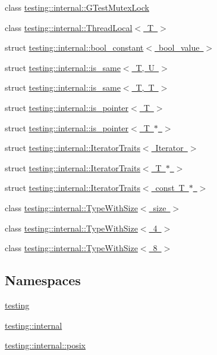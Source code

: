 \begin{DoxyCompactItemize}
\item 
class \mbox{\hyperlink{classtesting_1_1internal_1_1_g_test_mutex_lock}{testing\+::internal\+::\+G\+Test\+Mutex\+Lock}}
\item 
class \mbox{\hyperlink{classtesting_1_1internal_1_1_thread_local}{testing\+::internal\+::\+Thread\+Local$<$ T $>$}}
\item 
struct \mbox{\hyperlink{structtesting_1_1internal_1_1bool__constant}{testing\+::internal\+::bool\+\_\+constant$<$ bool\+\_\+value $>$}}
\item 
struct \mbox{\hyperlink{structtesting_1_1internal_1_1is__same}{testing\+::internal\+::is\+\_\+same$<$ T, U $>$}}
\item 
struct \mbox{\hyperlink{structtesting_1_1internal_1_1is__same_3_01_t_00_01_t_01_4}{testing\+::internal\+::is\+\_\+same$<$ T, T $>$}}
\item 
struct \mbox{\hyperlink{structtesting_1_1internal_1_1is__pointer}{testing\+::internal\+::is\+\_\+pointer$<$ T $>$}}
\item 
struct \mbox{\hyperlink{structtesting_1_1internal_1_1is__pointer_3_01_t_01_5_01_4}{testing\+::internal\+::is\+\_\+pointer$<$ T $\ast$ $>$}}
\item 
struct \mbox{\hyperlink{structtesting_1_1internal_1_1_iterator_traits}{testing\+::internal\+::\+Iterator\+Traits$<$ Iterator $>$}}
\item 
struct \mbox{\hyperlink{structtesting_1_1internal_1_1_iterator_traits_3_01_t_01_5_01_4}{testing\+::internal\+::\+Iterator\+Traits$<$ T $\ast$ $>$}}
\item 
struct \mbox{\hyperlink{structtesting_1_1internal_1_1_iterator_traits_3_01const_01_t_01_5_01_4}{testing\+::internal\+::\+Iterator\+Traits$<$ const T $\ast$ $>$}}
\item 
class \mbox{\hyperlink{classtesting_1_1internal_1_1_type_with_size}{testing\+::internal\+::\+Type\+With\+Size$<$ size $>$}}
\item 
class \mbox{\hyperlink{classtesting_1_1internal_1_1_type_with_size_3_014_01_4}{testing\+::internal\+::\+Type\+With\+Size$<$ 4 $>$}}
\item 
class \mbox{\hyperlink{classtesting_1_1internal_1_1_type_with_size_3_018_01_4}{testing\+::internal\+::\+Type\+With\+Size$<$ 8 $>$}}
\end{DoxyCompactItemize}
\subsection*{Namespaces}
\begin{DoxyCompactItemize}
\item 
 \mbox{\hyperlink{namespacetesting}{testing}}
\item 
 \mbox{\hyperlink{namespacetesting_1_1internal}{testing\+::internal}}
\item 
 \mbox{\hyperlink{namespacetesting_1_1internal_1_1posix}{testing\+::internal\+::posix}}
\end{DoxyCompactItemize}
